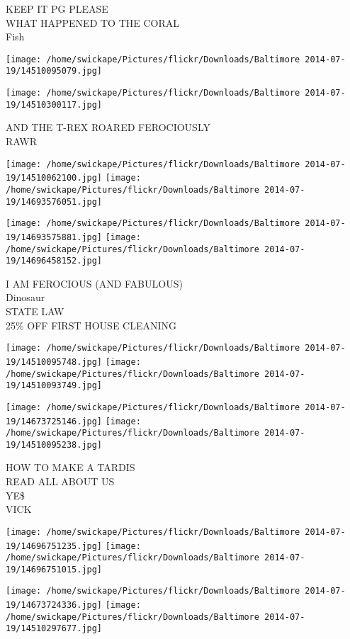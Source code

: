 \documentclass[10pt,letterpaper]{article}
\begin{document}
KEEP IT PG PLEASE\\
WHAT HAPPENED TO THE CORAL\\
Fish
\pagebreak

\texttt{[image: /home/swickape/Pictures/flickr/Downloads/Baltimore 2014-07-19/14510095079.jpg]}

\vspace{0.25in}
\texttt{[image: /home/swickape/Pictures/flickr/Downloads/Baltimore 2014-07-19/14510300117.jpg]}

AND THE T{-}REX ROARED FEROCIOUSLY\\
RAWR
\pagebreak

\texttt{[image: /home/swickape/Pictures/flickr/Downloads/Baltimore 2014-07-19/14510062100.jpg]}
\texttt{[image: /home/swickape/Pictures/flickr/Downloads/Baltimore 2014-07-19/14693576051.jpg]}

\texttt{[image: /home/swickape/Pictures/flickr/Downloads/Baltimore 2014-07-19/14693575881.jpg]}
\texttt{[image: /home/swickape/Pictures/flickr/Downloads/Baltimore 2014-07-19/14696458152.jpg]}

I AM FEROCIOUS (AND FABULOUS)\\
Dinosaur\\
STATE LAW\\
25\% OFF FIRST HOUSE CLEANING
\pagebreak

\texttt{[image: /home/swickape/Pictures/flickr/Downloads/Baltimore 2014-07-19/14510095748.jpg]}
\texttt{[image: /home/swickape/Pictures/flickr/Downloads/Baltimore 2014-07-19/14510093749.jpg]}

\texttt{[image: /home/swickape/Pictures/flickr/Downloads/Baltimore 2014-07-19/14673725146.jpg]}
\texttt{[image: /home/swickape/Pictures/flickr/Downloads/Baltimore 2014-07-19/14510095238.jpg]}

HOW TO MAKE A TARDIS\\
READ ALL ABOUT US\\
YE\$\\
VICK
\pagebreak

\texttt{[image: /home/swickape/Pictures/flickr/Downloads/Baltimore 2014-07-19/14696751235.jpg]}
\texttt{[image: /home/swickape/Pictures/flickr/Downloads/Baltimore 2014-07-19/14696751015.jpg]}

\texttt{[image: /home/swickape/Pictures/flickr/Downloads/Baltimore 2014-07-19/14673724336.jpg]}
\texttt{[image: /home/swickape/Pictures/flickr/Downloads/Baltimore 2014-07-19/14510297677.jpg]}
\end{document}
